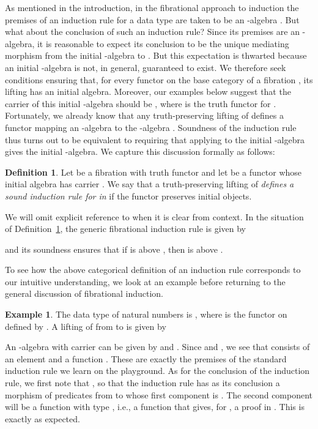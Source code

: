 \documentclass{LMCS}
\theoremstyle{plain}
\theoremstyle{remark}
\theoremstyle{definition}
\newtheorem{definition}[theorem]{Definition}
\newtheorem{example}[theorem]{Example}
\begin{document}
As mentioned in the introduction, in the fibrational approach to
induction the premises of an induction rule for a data type 
are taken to be an -algebra . But what
about the conclusion of such an induction rule? Since its premises are
an -algebra, it is reasonable to expect its conclusion to be
the unique mediating morphism from the initial -algebra to
.  But this expectation is thwarted because an initial
-algebra is not, in general, guaranteed to exist. We
therefore seek conditions ensuring that, for every functor  on the
base category of a fibration , its lifting  has an initial
algebra. Moreover, our examples below suggest that the carrier of this
initial -algebra should be , where  is the truth
functor for .  Fortunately, we already know that any
truth-preserving lifting  of  defines a functor  mapping an -algebra  to the -algebra .  Soundness of the induction rule thus turns out to be
equivalent to requiring that applying  to the initial
-algebra gives the initial -algebra. We capture this
discussion formally as follows:

\begin{definition}\label{def:ind}
  Let  be a fibration with truth functor  and
  let  be a functor whose initial algebra has carrier . We say that a truth-preserving lifting  of 
  \emph{defines a sound induction rule for  in } if the
  functor  preserves initial objects.
\end{definition}
\noindent
We will omit explicit reference to  when it is clear from context.
In the situation of Definition~\ref{def:ind}, the generic fibrational
induction rule is given by

and its soundness ensures that if  is above
, then  is above .

To see how the above categorical definition of an induction rule
corresponds to our intuitive understanding, we look at an example
before returning to the general discussion of fibrational induction.

\begin{example}
  The data type  of natural numbers is , where
   is the functor on  defined by . A lifting
   of  from  to  is given by

An -algebra with carrier  can
be given by  and .  Since  and , we see that  consists of an
element  and a function .  These are exactly the premises
of the standard induction rule we learn on the playground. As for the
conclusion of the induction rule, we first note that , so that the induction rule has as its conclusion a morphism
of predicates from  to  whose first component is
. The second component will be a function with type
, i.e., a function that gives,
for , a proof in . This is exactly as expected.
\end{example}
\end{document}
